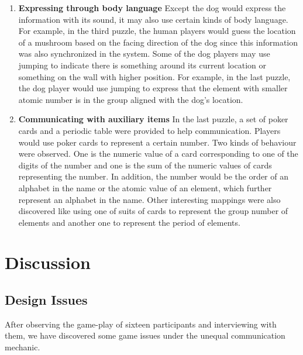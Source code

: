 \documentclass{sigchi}
\begin{document}
\begin{enumerate}
\item \textbf{Expressing through body language}\newline
Except the dog would express the information with its sound, it may also use certain kinds of body language. 
For example, in the third puzzle, the human players would guess the location of a mushroom based on the facing direction of the dog since this information was also synchronized in the system. Some of the dog players may use jumping to indicate there is something around its current location or something on the wall with higher position. For example, in the last puzzle, the dog player would use jumping to express that the element with smaller atomic number is in the group aligned with the dog's location.

\item \textbf{Communicating with auxiliary items}\newline
In the last puzzle, a set of poker cards and a periodic table were provided to help communication. Players would use poker cards to represent a certain number. Two kinds of behaviour were observed. One is the numeric value of a card corresponding to one of the digits of the number and one is the sum of the numeric values of cards representing the number. In addition, the number would be the order of an alphabet in the name or the atomic value of an element, which further represent an alphabet in the name. Other interesting mappings were also discovered like using one of suits of cards to represent the group number of elements and another one to represent the period of elements.

\end{enumerate}

\section{Discussion}
\subsection{Design Issues}
After observing the game-play of sixteen participants and interviewing with them, we have discovered some game issues under the unequal communication mechanic.
\end{document}
